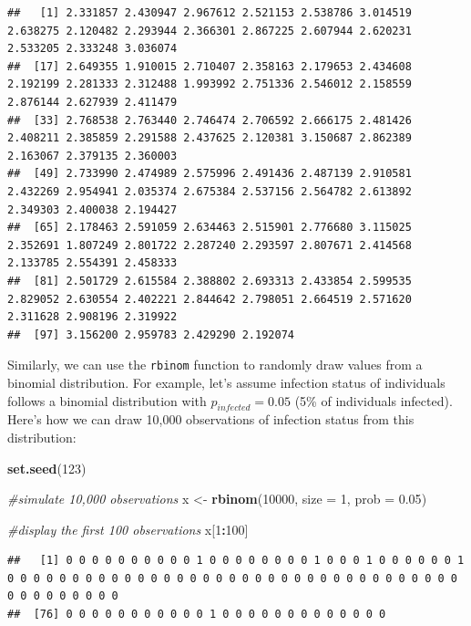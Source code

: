 \documentclass[
]{book}
\newenvironment{Shaded}{\begin{snugshade}}{\end{snugshade}}
\newcommand{\AttributeTok}[1]{\textcolor[rgb]{0.13,0.29,0.53}{#1}}
\newcommand{\CommentTok}[1]{\textcolor[rgb]{0.56,0.35,0.01}{\textit{#1}}}
\newcommand{\DecValTok}[1]{\textcolor[rgb]{0.00,0.00,0.81}{#1}}
\newcommand{\FloatTok}[1]{\textcolor[rgb]{0.00,0.00,0.81}{#1}}
\newcommand{\FunctionTok}[1]{\textcolor[rgb]{0.13,0.29,0.53}{\textbf{#1}}}
\newcommand{\NormalTok}[1]{#1}
\newcommand{\OtherTok}[1]{\textcolor[rgb]{0.56,0.35,0.01}{#1}}
\newcommand{\SpecialCharTok}[1]{\textcolor[rgb]{0.81,0.36,0.00}{\textbf{#1}}}
\begin{document}
\begin{verbatim}
##   [1] 2.331857 2.430947 2.967612 2.521153 2.538786 3.014519 2.638275 2.120482 2.293944 2.366301 2.867225 2.607944 2.620231 2.533205 2.333248 3.036074
##  [17] 2.649355 1.910015 2.710407 2.358163 2.179653 2.434608 2.192199 2.281333 2.312488 1.993992 2.751336 2.546012 2.158559 2.876144 2.627939 2.411479
##  [33] 2.768538 2.763440 2.746474 2.706592 2.666175 2.481426 2.408211 2.385859 2.291588 2.437625 2.120381 3.150687 2.862389 2.163067 2.379135 2.360003
##  [49] 2.733990 2.474989 2.575996 2.491436 2.487139 2.910581 2.432269 2.954941 2.035374 2.675384 2.537156 2.564782 2.613892 2.349303 2.400038 2.194427
##  [65] 2.178463 2.591059 2.634463 2.515901 2.776680 3.115025 2.352691 1.807249 2.801722 2.287240 2.293597 2.807671 2.414568 2.133785 2.554391 2.458333
##  [81] 2.501729 2.615584 2.388802 2.693313 2.433854 2.599535 2.829052 2.630554 2.402221 2.844642 2.798051 2.664519 2.571620 2.311628 2.908196 2.319922
##  [97] 3.156200 2.959783 2.429290 2.192074
\end{verbatim}

Similarly, we can use the \texttt{rbinom} function to randomly draw values from a binomial distribution. For example, let's assume infection status of individuals follows a binomial distribution with \(p_{infected} = 0.05\) (5\% of individuals infected). Here's how we can draw 10,000 observations of infection status from this distribution:

\begin{Shaded}
\begin{Highlighting}[]
\FunctionTok{set.seed}\NormalTok{(}\DecValTok{123}\NormalTok{)}

\CommentTok{\#simulate 10,000 observations}
\NormalTok{x }\OtherTok{\textless{}{-}} \FunctionTok{rbinom}\NormalTok{(}\DecValTok{10000}\NormalTok{, }\AttributeTok{size =} \DecValTok{1}\NormalTok{, }\AttributeTok{prob =} \FloatTok{0.05}\NormalTok{)}

\CommentTok{\#display the first 100 observations}
\NormalTok{x[}\DecValTok{1}\SpecialCharTok{:}\DecValTok{100}\NormalTok{]}
\end{Highlighting}
\end{Shaded}

\begin{verbatim}
##   [1] 0 0 0 0 0 0 0 0 0 0 1 0 0 0 0 0 0 0 0 1 0 0 0 1 0 0 0 0 0 0 1 0 0 0 0 0 0 0 0 0 0 0 0 0 0 0 0 0 0 0 0 0 0 0 0 0 0 0 0 0 0 0 0 0 0 0 0 0 0 0 0 0 0 0 0
##  [76] 0 0 0 0 0 0 0 0 0 0 0 1 0 0 0 0 0 0 0 0 0 0 0 0 0
\end{verbatim}
\end{document}
